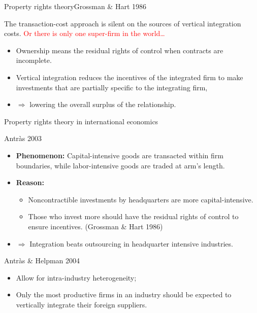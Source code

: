 \documentclass{beamer}
\begin{document}
\begin{frame}{Property rights theory}{Grossman \& Hart 1986}
	\begin{block}{}
		The transaction-cost approach is silent on the sources of vertical integration costs. \textcolor{red}{Or there is only one super-firm in the world\dots}
	\end{block}
	\begin{itemize}
		\item Ownership means the residual rights of control when contracts are incomplete.
		\item Vertical integration reduces the incentives of the integrated firm to make investments that are partially specific to the integrating firm,
		\item $\Rightarrow$ lowering the overall surplus of the relationship.
	\end{itemize}
\end{frame}
\begin{frame}{Property rights theory in international economics}{}
	\begin{block}{Antr\`as 2003}
		\begin{itemize}
			\item \textbf{Phenomenon:} Capital-intensive goods are transacted within firm boundaries, while labor-intensive goods are traded at arm's length.
			\item \textbf{Reason:}
			\begin{itemize}
				\item Noncontractible investments by headquarters are more capital-intensive.
				\item Those who invest more should have the residual rights of control to ensure incentives. (Grossman \& Hart 1986)
			\end{itemize}
			\item $\Rightarrow$ Integration beats outsourcing in headquarter intensive industries.
		\end{itemize}
	\end{block}
	\begin{block}{Antr\`as \& Helpman 2004}
		\begin{itemize}
			\item Allow for intra-industry heterogeneity;
			\item Only the most productive firms in an industry should be expected to vertically integrate their foreign suppliers.
		\end{itemize}
	\end{block}
\end{frame}
\end{document}
